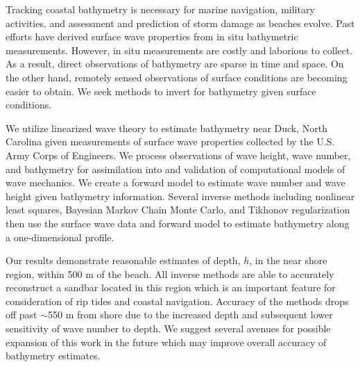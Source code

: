 Tracking coastal bathymetry is necessary for marine navigation, military activities, and assessment and prediction of storm damage as beaches evolve. Past efforts have derived surface wave properties from in situ bathymetric measurements. However, in situ measurements are costly and laborious to collect. As a result, direct observations of bathymetry are sparse in time and space. On the other hand, remotely sensed observations of surface conditions are becoming easier to obtain. We seek methods to invert for bathymetry given surface conditions. 

We utilize linearized wave theory to estimate bathymetry near Duck, North Carolina given measurements of surface wave properties collected by the U.S. Army Corps of Engineers. We process observations of wave height, wave number, and bathymetry for assimilation into and validation of computational models of wave mechanics. We create a forward model to estimate wave number and wave height given bathymetry information. Several inverse methods including nonlinear least squares, Bayesian Markov Chain Monte Carlo, and Tikhonov regularization then use the surface wave data and forward model to estimate bathymetry along a one-dimensional profile.

Our results demonstrate reasonable estimates of depth, $h$, in the near shore region, within 500 m of the beach. All inverse methods are able to accurately reconstruct a sandbar located in this region which is an important feature for consideration of rip tides and coastal navigation. Accuracy of the methods drops off past $\sim$550 m from shore due to the increased depth and subsequent lower sensitivity of wave number to depth. We suggest several avenues for possible expansion of this work in the future which may improve overall accuracy of bathymetry estimates.